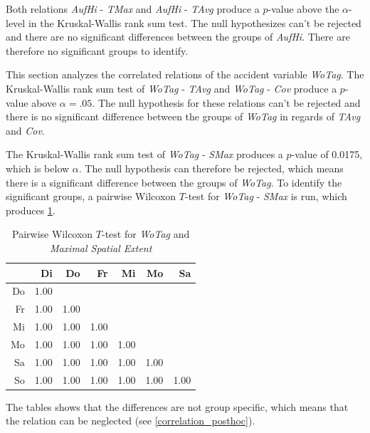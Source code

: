 Both relations \textit{AufHi} - \textit{TMax} and \textit{AufHi} - \textit{TAvg} produce a $p$-value above the $\alpha$-level in the Kruskal-Wallis rank sum test. The null hypothesizes can't be rejected and there are no significant differences between the groups of \textit{AufHi}. There are therefore no significant groups to identify.

This section analyzes the correlated relations of the accident variable \textit{WoTag}. The Kruskal-Wallis rank sum test of \textit{WoTag} - \textit{TAvg} and \textit{WoTag} - \textit{Cov} produce a $p$-value above $\alpha=.05$. The null hypothesis for these relations can't be rejected and there is no significant difference between the groups of \textit{WoTag} in regards of \textit{TAvg} and \textit{Cov}.

The Kruskal-Wallis rank sum test of \textit{WoTag} - \textit{SMax} produces a $p$-value of 0.0175, which is below $\alpha$. The null hypothesis can therefore be rejected, which means there is a significant difference between the groups of \textit{WoTag}. To identify the significant groups, a pairwise Wilcoxon $T$-test for \textit{WoTag} - \textit{SMax} is run, which produces \cref{tbl:wilcoxon_baysis_effector_WoTag_TMax}. 
\begin{table}[ht!]
	\tiny
	\centering
	\begin{tabular}{rrrrrrr}
		\toprule
		   & Di & Do & Fr & Mi & Mo & Sa \\ 
		\midrule
		Do & 1.00 &  &  &  &  &  \\ 
		Fr & 1.00 & 1.00 &  &  &  &  \\ 
		Mi & 1.00 & 1.00 & 1.00 &  &  &  \\ 
		Mo & 1.00 & 1.00 & 1.00 & 1.00 &  &  \\ 
		Sa & 1.00 & 1.00 & 1.00 & 1.00 & 1.00 &  \\ 
		So & 1.00 & 1.00 & 1.00 & 1.00 & 1.00 & 1.00 \\ 
		\bottomrule
	  \end{tabular}
    \caption{Pairwise Wilcoxon $T$-test for \textit{WoTag} and \textit{Maximal Spatial Extent}}
    \label{tbl:wilcoxon_baysis_effector_WoTag_TMax}
\end{table}
The tables shows that the differences are not group specific, which means that the relation can be neglected (see \cref{correlation_posthoc}).

